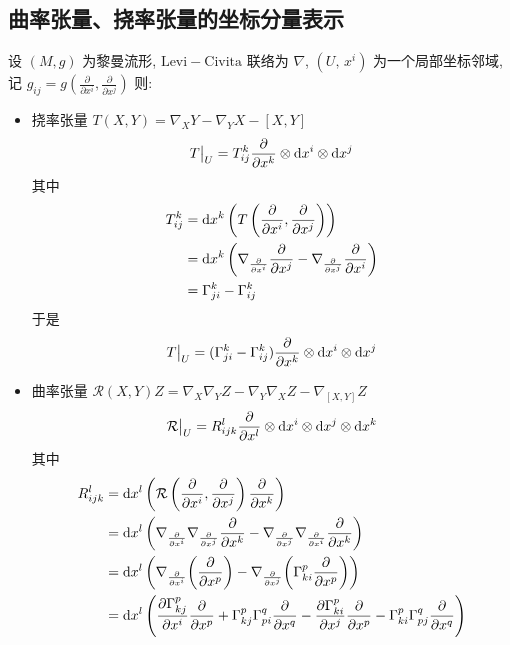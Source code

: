 \documentclass{book}
\newcommand{\md}{{\rm d}}
\newcommand{\pd}[2]{\frac{\partial #1}{\partial #2}}
\newcommand{\lc}[2]{\nabla_{#1}{#2}}
\begin{document}
    \subsection{曲率张量、挠率张量的坐标分量表示}
        设 $(M,g)$ 为黎曼流形, $\mathrm{Levi-Civita}$ 联络为 $\nabla$, $(U,\,x^i)$ 为一个局部坐标邻域,
        记 $g_{ij} = g\left(\pd{}{x^i},\pd{}{x^j}\right)$ 则:
        \begin{itemize}
            \item 挠率张量 $T(X,Y) = \lc{X}{Y}-\lc{Y}{X}-[X,Y]$
            \begin{equation*}
                T\big|_U = T_{ij}^{k}\pd{}{x^k}\otimes\md{x^i}\otimes\md{x^j}
            \end{equation*}
            其中
            \begin{align*}
                T_{ij}^{k} &= \md{x^k}\left(T\left(\pd{}{x^i},\pd{}{x^j}\right)\right) \\
                &= \md{x^k}\left(\lc{\pd{}{x^i}}{\pd{}{x^j}}-\lc{\pd{}{x^j}}{\pd{}{x^i}}\right) \\
                &= \Gamma_{ji}^{k}-\Gamma_{ij}^{k}
            \end{align*}
            于是
            \begin{equation*}
                T\big|_U = (\Gamma_{ji}^{k}-\Gamma_{ij}^{k})\pd{}{x^k}\otimes\md{x^i}\otimes\md{x^j}
            \end{equation*}
            \item 曲率张量 $\mathcal{R}(X,Y)Z = \lc{X}{\lc{Y}{Z}} - \lc{Y}{\lc{X}{Z}} - \lc{[X,Y]}{Z}$
            \begin{equation*}
                \mathcal{R}\big|_U = R_{ijk}^{l}\pd{}{x^l}\otimes\md{x^i}\otimes\md{x^j}\otimes\md{x^k}
            \end{equation*}
            其中
            \begin{align*}
                R_{ijk}^{l} &= \md{x^l}\left(\mathcal{R}\left(\pd{}{x^i},\pd{}{x^j}\right)\pd{}{x^k}\right) \\
                &= \md{x^l}\left(\lc{\pd{}{x^i}}{\lc{\pd{}{x^j}}{\pd{}{x^k}}} - \lc{\pd{}{x^j}}{\lc{\pd{}{x^i}}{\pd{}{x^k}}}\right) \\
                &= \md{x^l}\left(\lc{\pd{}{x^i}}{\left(\pd{}{x^p}\right)} - \lc{\pd{}{x^j}}{\left(\Gamma_{ki}^{p}\pd{}{x^p}\right)}\right) \\
                &= \md{x^l}\left(\pd{\Gamma_{kj}^{p}}{x^i}\pd{}{x^p} + \Gamma_{kj}^{p}\Gamma_{pi}^{q}\pd{}{x^q} - \pd{\Gamma_{ki}^{p}}{x^j}\pd{}{x^p} - \Gamma_{ki}^{p}\Gamma_{pj}^{q}\pd{}{x^q}\right) \\

\end{align*}
\end{itemize}
\end{document}
